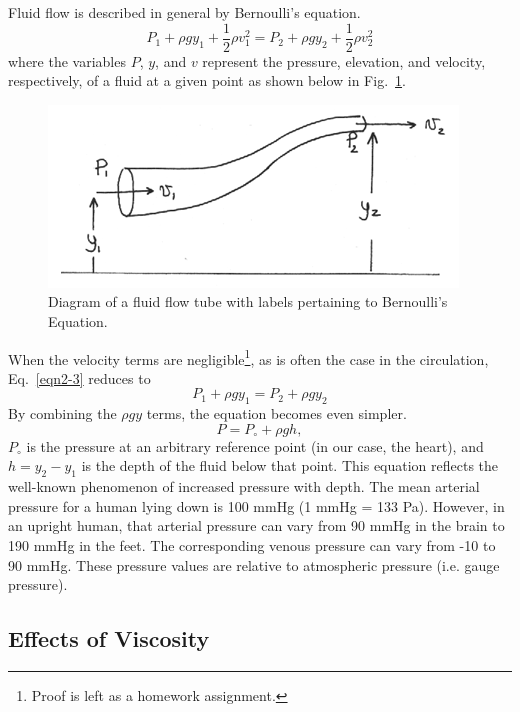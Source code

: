 Fluid flow is described in general by Bernoulli's equation.
\begin{equation}\label{eqn2-3}
P_1 + \rho g y_1 + \frac{1}{2}\rho v_1^2 = P_2 + \rho g y_2 + \frac{1}{2}\rho v_2^2
\end{equation}
where the variables $P$, $y$, and $v$ represent the pressure, elevation, and velocity, respectively, of a fluid at a given point as shown below in Fig.~\ref{Fig2-7}.
\begin{figure}[htb]
	\centering
	\includegraphics[width=\textwidth]{./figures/Topic2/Fig2-6.png}
	\caption{Diagram of a fluid flow tube with labels pertaining to Bernoulli's Equation.}
	\label{Fig2-7}
\end{figure}
When the velocity terms are negligible\footnote[2]{Proof is left as a homework assignment.}, as is often the case in the circulation, Eq.~\ref{eqn2-3} reduces to 
\begin{equation}\label{eqn2-4}
P_1 + \rho g y_1 = P_2 + \rho g y_2
\end{equation}
By combining the $\rho g y$ terms, the equation becomes even simpler.
\begin{equation}\label{eqn2-5}
P = P_{\circ}+ \rho g h,
\end{equation}
$P_{\circ}$ is the pressure at an arbitrary reference point (in our case, the heart), and $h = y_2-y_1$ is the depth of the fluid below that point. This equation reflects the well-known phenomenon of increased pressure with depth.  The mean arterial pressure for a human lying down is 100 mmHg (1 mmHg = 133 Pa). However, in an upright human, that arterial pressure can vary from 90 mmHg in the brain to 190 mmHg in the feet. The corresponding venous pressure can vary from -10 to 90 mmHg. These pressure values are relative to atmospheric pressure (i.e. gauge pressure).

\subsection{Effects of Viscosity}

